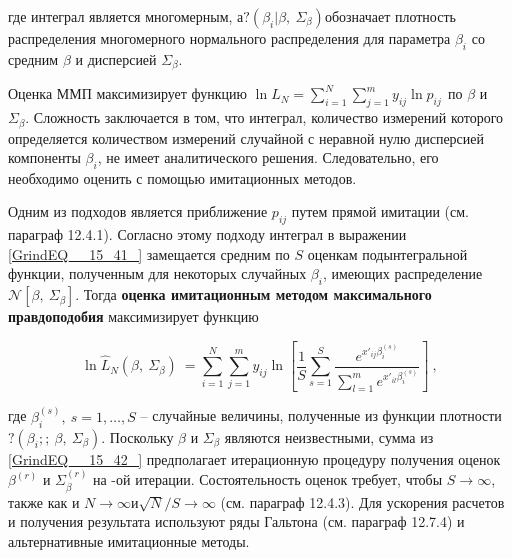 где интеграл является многомерным, а$?({\beta }_i|\beta ,\ {\Sigma }_{\beta })$обозначает плотность распределения многомерного нормального распределения для параметра ${\beta }_i$ со средним $\beta $ и дисперсией ${\Sigma }_{\beta }.\ \ $

Оценка ММП максимизирует функцию ${\ln  L_N=\sum^N_{i=1}{\sum^m_{j=1}{y_{ij}{\ln  p_{ij}\ }}}\ }$по $\beta $ и ${\Sigma }_{\beta }.$ Сложность заключается в том, что интеграл, количество измерений которого определяется количеством измерений случайной с неравной нулю дисперсией компоненты ${\beta }_i$, не имеет аналитического решения. Следовательно, его необходимо оценить с помощью имитационных методов.

Одним из подходов является приближение $p_{ij}$ путем прямой имитации (см. параграф 12.4.1). Согласно этому подходу интеграл в выражении \eqref{GrindEQ__15_41_} замещается средним по $S$ оценкам подынтегральной функции, полученным для некоторых случайных ${\beta }_i$, имеющих распределение${\mathcal N}[\beta ,\ {\Sigma }_{\beta }]$. Тогда \textbf{оценка имитационным методом максимального правдоподобия }максимизирует функцию

\begin{equation} \label{GrindEQ__15_42_} {\ln  {\hat{L}}_N(\beta ,\ {\Sigma }_{\beta })\ }=\sum^N_{i=1}{\sum^m_{j=1}{y_{ij}{\ln  \left[\frac{1}{S}\sum^S_{s=1}{\frac{e^{x'_{ij}{\beta }^{\left(s\right)}_i}}{\sum^m_{l=1}{e^{x'_{il}{\beta }^{\left(s\right)}_i}}}}\right]\ }}}, \end{equation} 

где ${\beta }^{\left(s\right)}_i,\ s=1,\dots ,S$ -- случайные величины, полученные из функции плотности $?\left({\beta }_i;;\ \beta ,\ {\Sigma }_{\beta }\right).$ Поскольку $\beta $ и ${\Sigma }_{\beta }$ являются неизвестными, сумма из \eqref{GrindEQ__15_42_} предполагает итерационную процедуру получения оценок ${\beta }^{(r)}$ и ${\Sigma }^{(r)}_{\beta }$ на -ой итерации. Состоятельность оценок требует, чтобы  $S\to \infty $, также как и $N\to \infty $и$\sqrt{N}/S\to \infty $ (см. параграф 12.4.3). Для ускорения расчетов и получения результата используют ряды Гальтона (см. параграф 12.7.4) и альтернативные имитационные методы.

